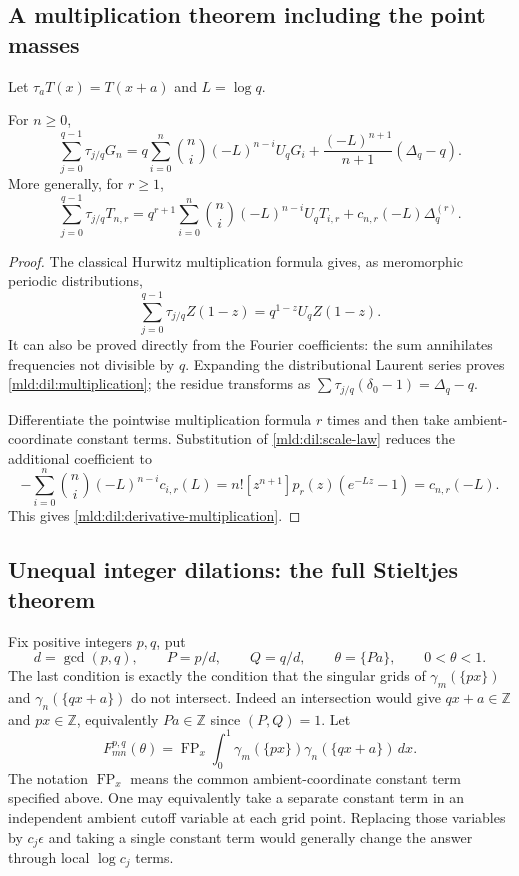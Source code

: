 \subsection{A multiplication theorem including the point masses}
Let $\tau_aT(x)=T(x+a)$ and $L=\log q$.
\begin{theorem}
For $n\ge0$,
\begin{equation}
 \sum_{j=0}^{q-1}\tau_{j/q}G_n
 =q\sum_{i=0}^n\binom ni(-L)^{n-i}U_qG_i
     +\frac{(-L)^{n+1}}{n+1}(\Delta_q-q).
 \label{mld:dil:multiplication}
\end{equation}
More generally, for $r\ge1$,
\begin{equation}
 \sum_{j=0}^{q-1}\tau_{j/q}T_{n,r}
 =q^{r+1}\sum_{i=0}^n\binom ni(-L)^{n-i}U_qT_{i,r}
                  +c_{n,r}(-L)\Delta_q^{(r)}.
 \label{mld:dil:derivative-multiplication}
\end{equation}
\end{theorem}
\begin{proof}
The classical Hurwitz multiplication formula gives, as meromorphic
periodic distributions,
\[
 \sum_{j=0}^{q-1}\tau_{j/q}Z(1-z)
                  =q^{1-z}U_qZ(1-z).
\]
It can also be proved directly from the Fourier coefficients: the
sum annihilates frequencies not divisible by $q$.  Expanding the
distributional Laurent series proves \eqref{mld:dil:multiplication}; the
residue transforms as $\sum\tau_{j/q}(\delta_0-1)=\Delta_q-q$.

Differentiate the pointwise multiplication formula $r$ times and then
take ambient-coordinate constant terms.  Substitution of
\eqref{mld:dil:scale-law} reduces the additional coefficient to
\[
 -\sum_{i=0}^n\binom ni(-L)^{n-i}c_{i,r}(L)
 =n![z^{n+1}]p_r(z)(e^{-Lz}-1)=c_{n,r}(-L).
\]
This gives \eqref{mld:dil:derivative-multiplication}.
\end{proof}



\subsection{Unequal integer dilations: the full Stieltjes theorem}
Fix positive integers $p,q$, put
\begin{equation}
 d=\gcd(p,q),\qquad P=p/d,\qquad Q=q/d,\qquad
 \theta=\{Pa\},\qquad 0<\theta<1.
 \label{mld:dil:parameters}
\end{equation}
The last condition is exactly the condition that the singular grids of
$\gamma_m(\{px\})$ and $\gamma_n(\{qx+a\})$ do not intersect.
Indeed an intersection would give $qx+a\in\mathbb Z$ and
$px\in\mathbb Z$, equivalently $Pa\in\mathbb Z$ since $(P,Q)=1$.
Let
\[
 F_{mn}^{p,q}(\theta)
 =\operatorname{FP}_x\int_0^1
       \gamma_m(\{px\})\gamma_n(\{qx+a\})\,dx.
\]
The notation $\operatorname{FP}_x$ means the common ambient-coordinate
constant term specified above. One may equivalently take a separate
constant term in an independent ambient cutoff variable at each grid
point. Replacing those variables by $c_j\epsilon$ and taking a single
constant term would generally change the answer through local
$\log c_j$ terms.


